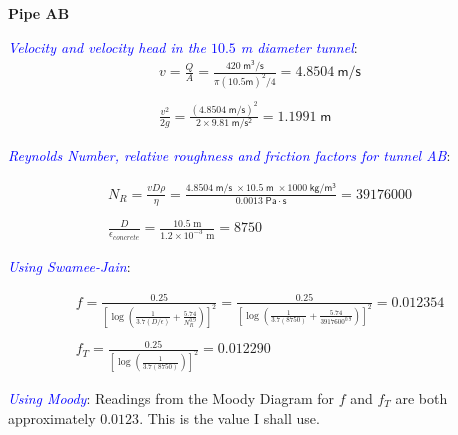 \documentclass[10pt]{amsart}
\begin{document}
\textbf{Pipe AB}

\textcolor{blue}{\em Velocity and velocity head in the $10.5$ m diameter tunnel}:\\

\begin{gather*}
	v = \frac{Q}{A} = \frac{420\mathsf{\;m^3/s}}{\pi(10.5\mathsf{ m})^2/4}=4.8504\mathsf{\ m/s} \\\\
	\frac{v^2}{2g} = \frac{(4.8504\mathsf{\;m/s})^2}{2\times9.81\mathsf{\;m/s^2}} = 1.1991\mathsf{\; m}
\end{gather*}

\textcolor{blue}{\em Reynolds Number, relative roughness and friction factors for tunnel AB}:

\begin{gather*}
	N_R = \frac{vD\rho}{\eta} =
	\frac{4.8504\mathsf{\;m/s\;}\times10.5\mathsf{\;m\;}\times1000\mathsf{\;kg/m^3}}{0.0013\;\mathsf{Pa\cdot s}} =
	39176000\\\\
	\frac{D}{\epsilon_{concrete}} = \frac{10.5\;\text{m}}{1.2\times10^{-3}\text{ m}} = 8750
\end{gather*}

\textcolor{blue}{\em Using Swamee-Jain}:

\begin{gather*}
	f = \frac{0.25}{\left[\log\left(\frac{1}{3.7(D/\epsilon)}+\frac{5.74}{N_R^{0.9}}\right)\right]^2} =
	\frac{0.25}{\left[\log\left(\frac{1}{3.7(8750)}+\frac{5.74}{3917600^{0.9}}\right)\right]^2}=0.012354
	\\\\
	f_T = \frac{0.25}{\left[\log\left(\frac{1}{3.7(8750)}\right)\right]^2} = 0.012290
\end{gather*}


\textcolor{blue}{\em Using Moody}:
Readings from the Moody Diagram for $f$ and $f_T$ are both approximately $0.0123$. This is the
value I shall use.
\end{document}
